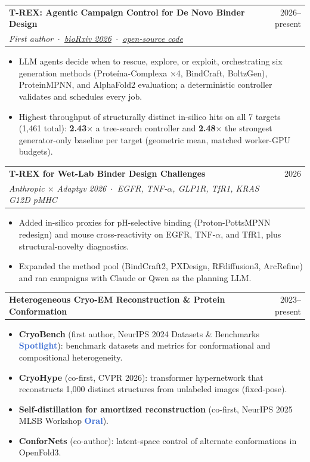 \documentclass[10pt,letterpaper]{article}
\makeatletter
\newcommand{\award}[1]{\textcolor{highlight}{\sffamily\bfseries\small #1}}
\newcommand{\cvsection}[1]{%
  \vspace{6pt}%
  {\sffamily\bfseries\color{accent}\textls[60]{\MakeUppercase{#1}}}\par
  \vspace{2pt}{\color{accent}\hrule height 0.5pt}\vspace{4pt}}
\newcommand{\entry}[4]{%
  \begin{tabularx}{\linewidth}{@{}X r@{}}
    {\bfseries #1} & {\sffamily\small\color{muted}#2}\\
    {\itshape #3}  & {\small\color{muted}#4}
  \end{tabularx}\par\vspace{1pt}}
\newcommand{\entryone}[2]{%
  \begin{tabularx}{\linewidth}{@{}X r@{}}
    {\bfseries #1} & {\sffamily\small\color{muted}#2}
  \end{tabularx}\par\vspace{1pt}}
\makeatother
\begin{document}
\cvsection{Selected Research}
\entry{T-REX: Agentic Campaign Control for De Novo Binder Design}{2026--present}
  {First author \,$\cdot$\,
   \href{https://www.biorxiv.org/content/10.64898/2026.09.22.753604v2}{bioRxiv 2026}
   \,$\cdot$\, \href{https://github.com/ml-struct-bio/T-REX}{open-source code}}{}
\begin{itemize}
  \item LLM agents decide when to rescue, explore, or exploit, orchestrating six generation methods
        (Prote\'ina-Complexa $\times$4, BindCraft, BoltzGen), ProteinMPNN, and AlphaFold2
        evaluation; a deterministic controller validates and schedules every job.
  \item Highest throughput of structurally distinct in-silico hits on all 7 targets (1,461 total):
        \textbf{2.43$\times$} a tree-search controller and \textbf{2.48$\times$} the strongest
        generator-only baseline per target (geometric mean, matched worker-GPU budgets).
\end{itemize}
\vspace{2pt}

\entry{T-REX for Wet-Lab Binder Design Challenges}{2026}
  {Anthropic $\times$ Adaptyv 2026 \,$\cdot$\, EGFR, TNF-$\alpha$, GLP1R, TfR1, KRAS G12D pMHC}{}
\begin{itemize}
  \item Added in-silico proxies for pH-selective binding (Proton-PottsMPNN redesign) and mouse
        cross-reactivity on EGFR, TNF-$\alpha$, and TfR1, plus structural-novelty diagnostics.
  \item Expanded the method pool (BindCraft2, PXDesign, RFdiffusion3, ArcRefine) and ran
        campaigns with Claude or Qwen as the planning LLM.
\end{itemize}
\vspace{2pt}

\entryone{Heterogeneous Cryo-EM Reconstruction \& Protein Conformation}{2023--present}
\begin{itemize}
  \item \textbf{CryoBench} (first author, NeurIPS 2024 Datasets \& Benchmarks \award{Spotlight}): benchmark
        datasets and metrics for conformational and compositional heterogeneity.
  \item \textbf{CryoHype} (co-first, CVPR 2026): transformer hypernetwork that reconstructs
        1,000 distinct structures from unlabeled images (fixed-pose).
  \item \textbf{Self-distillation for amortized reconstruction} (co-first, NeurIPS 2025 MLSB
        Workshop \award{Oral}).
  \item \textbf{ConforNets} (co-author): latent-space control of alternate conformations
        in OpenFold3.
\end{itemize}
\end{document}
